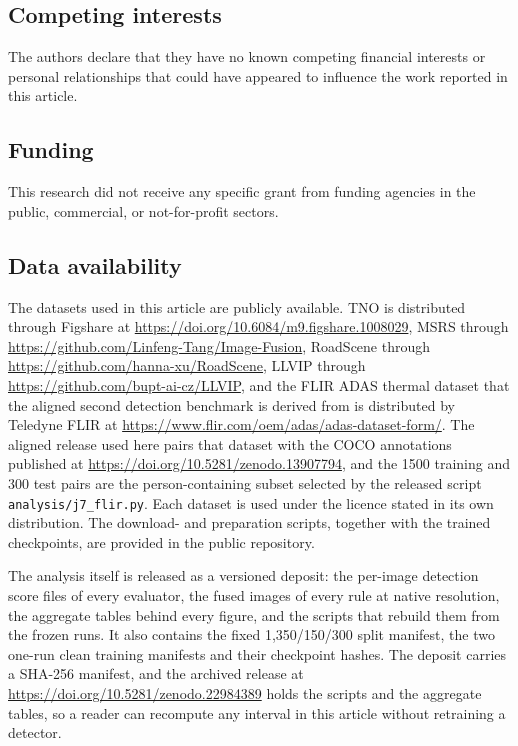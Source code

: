 \documentclass[10pt,a4paper]{article}
\begin{document}
\subsection*{Competing interests}
The authors declare that they have no known competing financial interests or
personal relationships that could have appeared to influence the work reported in
this article.

\subsection*{Funding}
This research did not receive any specific grant from funding agencies in the
public, commercial, or not-for-profit sectors.

\subsection*{Data availability}
\begin{sloppypar}
The datasets used in this article are publicly available. TNO is distributed through
Figshare at \url{https://doi.org/10.6084/m9.figshare.1008029}, MSRS through
\url{https://github.com/Linfeng-Tang/Image-Fusion}, RoadScene through
\url{https://github.com/hanna-xu/RoadScene}, LLVIP through
\url{https://github.com/bupt-ai-cz/LLVIP}, and the FLIR ADAS thermal dataset that the
aligned second detection benchmark is derived from is distributed by Teledyne FLIR at
\url{https://www.flir.com/oem/adas/adas-dataset-form/}. The aligned release used here
pairs that dataset with the COCO annotations published at
\url{https://doi.org/10.5281/zenodo.13907794}, and the 1500 training and 300 test pairs
are the person-containing subset selected by the released script
\texttt{analysis/j7\_flir.py}. Each dataset is used under the licence stated in its own
distribution. The
download- and preparation scripts, together with the trained checkpoints, are provided
in the public repository.
\end{sloppypar}

\begin{sloppypar}
The analysis itself is released as a versioned deposit: the per-image detection score
files of every evaluator, the fused images of every rule at native resolution, the
aggregate tables behind every figure, and the scripts that rebuild them from the frozen
runs. It also contains the fixed 1,350/150/300 split manifest, the two one-run clean
training manifests and their checkpoint hashes. The deposit carries a SHA-256 manifest, and the archived release at
\url{https://doi.org/10.5281/zenodo.22984389} holds the scripts and the aggregate tables,
so a reader can recompute any interval in this article without retraining a detector.
\end{sloppypar}
\end{document}
